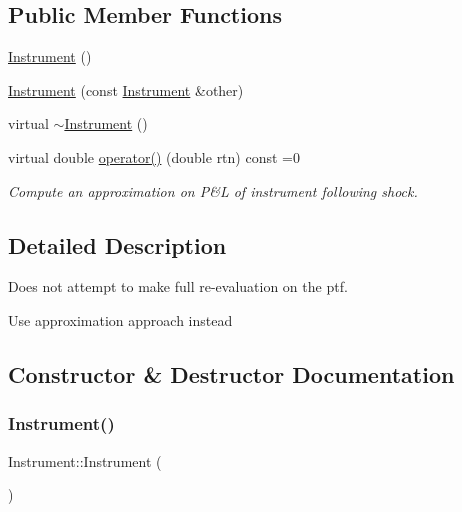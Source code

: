 \subsection*{Public Member Functions}
\begin{DoxyCompactItemize}
\item 
\hyperlink{classInstrument_a1a297b2cbe1e239c8ede2e90185e2880}{Instrument} ()
\item 
\hyperlink{classInstrument_a2704ef015e35f22e444f8e15ece24be0}{Instrument} (const \hyperlink{classInstrument}{Instrument} \&other)
\item 
virtual \hyperlink{classInstrument_a28512cef5ccbedc9094876866f06f921}{$\sim$\+Instrument} ()
\item 
virtual double \hyperlink{classInstrument_a33b6faccaeb494858dee5c547de897b6}{operator()} (double rtn) const =0
\begin{DoxyCompactList}\small\item\em Compute an approximation on P\&L of instrument following shock. \end{DoxyCompactList}\end{DoxyCompactItemize}


\subsection{Detailed Description}
Does not attempt to make full re-\/evaluation on the ptf.

Use approximation approach instead 

\subsection{Constructor \& Destructor Documentation}
\hypertarget{classInstrument_a1a297b2cbe1e239c8ede2e90185e2880}{}\label{classInstrument_a1a297b2cbe1e239c8ede2e90185e2880} 
\subsubsection{\texorpdfstring{Instrument()}{Instrument()}\hspace{0.1cm}{\footnotesize\ttfamily [1/2]}}
{\footnotesize\ttfamily Instrument\+::\+Instrument (\begin{DoxyParamCaption}{ }\end{DoxyParamCaption})\hspace{0.3cm}{\ttfamily [inline]}}

